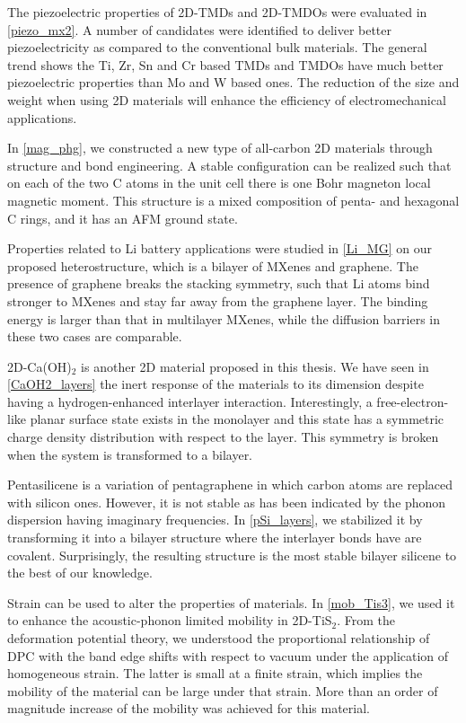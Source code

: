 The piezoelectric properties of 2D-TMDs and 2D-TMDOs were evaluated in \autoref{piezo_mx2}. A number of candidates were identified to deliver better piezoelectricity as compared to the conventional bulk materials. The general trend shows the Ti,  Zr, Sn and Cr based TMDs and TMDOs have much better piezoelectric properties than Mo and W based ones. The reduction of the size and weight when using 2D materials will enhance the efficiency of electromechanical applications.

In \autoref{mag_phg}, we constructed a new type of all-carbon 2D materials through structure and bond engineering. A stable configuration can be realized such that on each of the two C atoms in the unit cell there is one Bohr magneton local magnetic moment. This structure is a mixed composition of penta- and hexagonal C rings, and it has an AFM ground state.

Properties related to Li battery applications were studied in \autoref{Li_MG} on our proposed heterostructure, which is a bilayer of MXenes and graphene. The presence of graphene breaks the stacking symmetry, such that Li atoms bind stronger to MXenes and stay far away from the graphene layer. The binding energy is larger than that in multilayer MXenes, while the diffusion barriers in these two cases are comparable. 

2D-Ca(OH)$_2$ is another 2D material proposed in this thesis. We have seen in \autoref{CaOH2_layers} the inert response of the materials to its dimension despite having a hydrogen-enhanced interlayer interaction. Interestingly, a free-electron-like planar surface state exists in the monolayer and this state has a symmetric charge density distribution with respect to the layer. This symmetry is broken when the system is transformed to a bilayer.

Pentasilicene is a variation of pentagraphene in which carbon atoms are replaced with silicon ones. However, it is not stable as has been indicated by the phonon dispersion having imaginary frequencies. In \autoref{pSi_layers}, we stabilized it by transforming it into a bilayer structure where the interlayer bonds have are covalent. Surprisingly, the resulting structure is the most stable bilayer silicene to the best of our knowledge.

Strain can be used to alter the properties of materials. In \autoref{mob_Tis3}, we used it to enhance the acoustic-phonon limited mobility in 2D-TiS$_2$. From the deformation potential theory, we understood the proportional relationship of DPC with the band edge shifts with respect to vacuum under the application of homogeneous strain. The latter is small at a finite strain, which implies the mobility of the material can be large under that strain. More than an order of magnitude increase of the mobility was achieved for this material.

